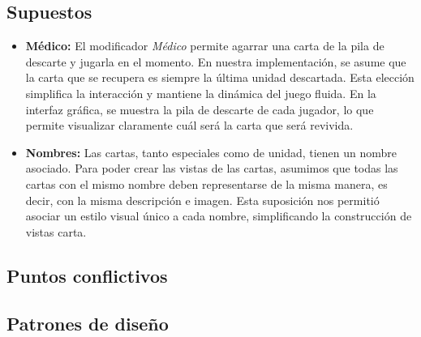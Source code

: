 \documentclass[titlepage,a4paper]{article}
\begin{document}
	\subsection{Supuestos}\label{sup:intro}
	\begin{itemize}
		\item \textbf{Médico:} El modificador \textit{Médico} permite agarrar una carta de la pila de descarte y jugarla en el momento.
		En nuestra implementación, se asume que la carta que se recupera es siempre la última unidad descartada. Esta elección simplifica la interacción y mantiene la dinámica del juego fluida. En la interfaz gráfica, se muestra la pila de descarte de cada jugador, lo que permite visualizar claramente cuál será la carta que será revivida.

		\item \textbf{Nombres:} Las cartas, tanto especiales como de unidad, tienen un nombre asociado. Para poder crear las vistas de las cartas, asumimos que todas las cartas con el mismo nombre deben representarse de la misma manera, es decir, con la misma descripción e imagen. Esta suposición nos permitió asociar un estilo visual único a cada nombre, simplificando la construcción de vistas carta.

	\end{itemize}

	\subsection{Puntos conflictivos}\label{sup:conflicto}




	\subsection{Patrones de diseño}\label{sup:patrones}
\end{document}
